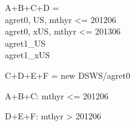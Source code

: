 

\usepackage[T1]{fontenc}




\thispagestyle{fancy}

\newcommand{\code}{\texttt}
\newcommand*{\Commonpath}{20190201}

A+B+C+D = \\
agret0, US, mthyr <= 201206 \\
agret0, xUS, mthyr <= 201306 \\
agret1\_US \\
agret1\_xUS


C+D+E+F = new DSWS/agret0

A+B+C: mthyr <= 201206

D+E+F: mthyr > 201206








